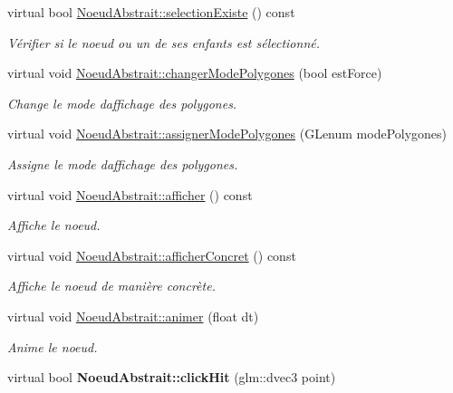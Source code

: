 \begin{DoxyCompactItemize}
virtual bool \hyperlink{group__inf2990_gae7c702b865babd20ddd30dd776adc82b}{Noeud\+Abstrait\+::selection\+Existe} () const 
\begin{DoxyCompactList}\small\item\em Vérifier si le noeud ou un de ses enfants est sélectionné. \end{DoxyCompactList}\item 
virtual void \hyperlink{group__inf2990_ga13a97383c2081b405fc2e0d97cff80df}{Noeud\+Abstrait\+::changer\+Mode\+Polygones} (bool est\+Force)
\begin{DoxyCompactList}\small\item\em Change le mode d\textquotesingle{}affichage des polygones. \end{DoxyCompactList}\item 
virtual void \hyperlink{group__inf2990_ga726d9d0a524939f405aeeac3fbd06666}{Noeud\+Abstrait\+::assigner\+Mode\+Polygones} (G\+Lenum mode\+Polygones)
\begin{DoxyCompactList}\small\item\em Assigne le mode d\textquotesingle{}affichage des polygones. \end{DoxyCompactList}\item 
virtual void \hyperlink{group__inf2990_gae789271ea41032d717b8e4300be05de0}{Noeud\+Abstrait\+::afficher} () const 
\begin{DoxyCompactList}\small\item\em Affiche le noeud. \end{DoxyCompactList}\item 
virtual void \hyperlink{group__inf2990_ga330df455c8b08440d3c8e64d0a480391}{Noeud\+Abstrait\+::afficher\+Concret} () const 
\begin{DoxyCompactList}\small\item\em Affiche le noeud de manière concrète. \end{DoxyCompactList}\item 
virtual void \hyperlink{group__inf2990_gadc6ebe69894dbb682fdd0ecb1b6c11e9}{Noeud\+Abstrait\+::animer} (float dt)
\begin{DoxyCompactList}\small\item\em Anime le noeud. \end{DoxyCompactList}\item 
\hypertarget{group__inf2990_gaa43f307d42d6dd8890cdce48c5c53128}{}virtual bool {\bfseries Noeud\+Abstrait\+::click\+Hit} (glm\+::dvec3 point)\label{group__inf2990_gaa43f307d42d6dd8890cdce48c5c53128}


\end{DoxyCompactItemize}
